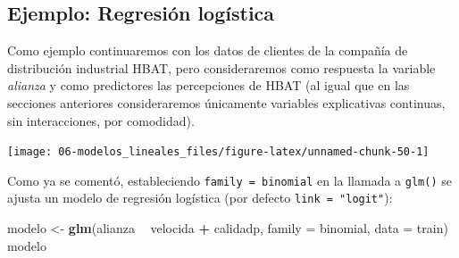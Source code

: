 \documentclass[
]{book}
\newenvironment{Shaded}{\begin{snugshade}}{\end{snugshade}}
\newcommand{\CommentTok}[1]{\textcolor[rgb]{0.56,0.35,0.01}{\textit{#1}}}
\newcommand{\DataTypeTok}[1]{\textcolor[rgb]{0.13,0.29,0.53}{#1}}
\newcommand{\DecValTok}[1]{\textcolor[rgb]{0.00,0.00,0.81}{#1}}
\newcommand{\FloatTok}[1]{\textcolor[rgb]{0.00,0.00,0.81}{#1}}
\newcommand{\KeywordTok}[1]{\textcolor[rgb]{0.13,0.29,0.53}{\textbf{#1}}}
\newcommand{\NormalTok}[1]{#1}
\newcommand{\OperatorTok}[1]{\textcolor[rgb]{0.81,0.36,0.00}{\textbf{#1}}}
\newcommand{\StringTok}[1]{\textcolor[rgb]{0.31,0.60,0.02}{#1}}
\theoremstyle{break}
\theoremstyle{definition}
\theoremstyle{definition}
\theoremstyle{definition}
\theoremstyle{remark}
\begin{document}
\hypertarget{ejemplo-regresiuxf3n-loguxedstica}{%
\subsection{Ejemplo: Regresión logística}\label{ejemplo-regresiuxf3n-loguxedstica}}

Como ejemplo continuaremos con los datos de clientes de la compañía de distribución industrial HBAT, pero consideraremos como respuesta la variable \emph{alianza} y como predictores las percepciones de HBAT (al igual que en las secciones anteriores consideraremos únicamente variables explicativas continuas, sin interacciones, por comodidad).

\begin{Shaded}
\end{Shaded}

\begin{center}\texttt{[image: 06-modelos\_lineales\_files/figure-latex/unnamed-chunk-50-1]} \end{center}

Como ya se comentó, estableciendo \texttt{family\ =\ binomial} en la llamada a \texttt{glm()} se ajusta un modelo de regresión logística (por defecto \texttt{link\ =\ "logit"}):

\begin{Shaded}
\begin{Highlighting}[]
\NormalTok{modelo <-}\StringTok{ }\KeywordTok{glm}\NormalTok{(alianza }\OperatorTok{~}\StringTok{ }\NormalTok{velocida }\OperatorTok{+}\StringTok{ }\NormalTok{calidadp, }\DataTypeTok{family =}\NormalTok{ binomial, }\DataTypeTok{data =}\NormalTok{ train)}
\NormalTok{modelo}
\end{Highlighting}
\end{Shaded}
\end{document}
